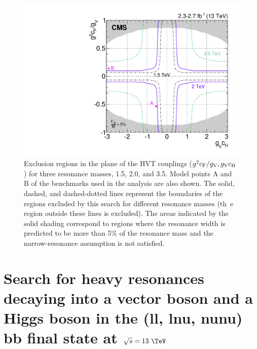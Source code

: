 \begin{figure}[!htb]
\centering
     \includegraphics[width=\cmsFigWidth]{B2G-16-004/Figure_007.pdf}
\caption{
Exclusion regions in the plane of the HVT couplings ($g^2c_\mathrm{F}/g_{\mathrm{V}},g_{\mathrm{V}}c_\mathrm{H}$) for three
resonance masses, 1.5, 2.0, and 3.5\TeV. Model points A and B of the benchmarks used in the analysis are also shown.
The solid, dashed, and dashed-dotted lines represent the boundaries of the regions excluded by this search for different resonance masses (th\
e region outside these lines is excluded).
The areas indicated by the solid shading correspond to
regions where the resonance width is predicted to be more than 5\% of the resonance mass and
the narrow-resonance assumption is not satisfied.}
\label{fig:hvtscan}
\end{figure}



\section{Search for heavy resonances decaying into a vector boson and a Higgs boson in the (ll, lnu, nunu) bb final state at $\sqrt{s}=13~\TeV$\label{sec:vh}}

